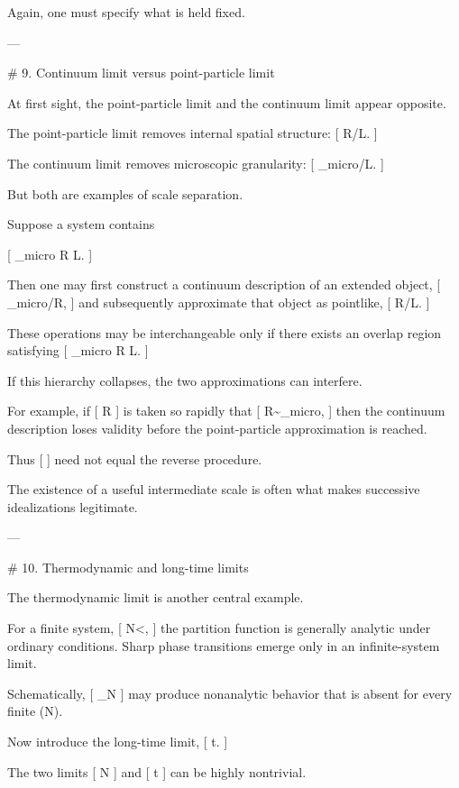 Again, one must specify what is held fixed.

---

# 9. Continuum limit versus point-particle limit

At first sight, the point-particle limit and the continuum limit appear opposite.

The point-particle limit removes internal spatial structure:
[
R/L.
]

The continuum limit removes microscopic granularity:
[
\ell_{\rm micro}/L.
]

But both are examples of scale separation.

Suppose a system contains

[
\ell_{\rm micro}
\ll
R
\ll
L.
]

Then one may first construct a continuum description of an extended object,
[
\ell_{\rm micro}/R,
]
and subsequently approximate that object as pointlike,
[
R/L.
]

These operations may be interchangeable only if there exists an overlap region satisfying
[
\ell_{\rm micro}
\ll
R
\ll
L.
]

If this hierarchy collapses, the two approximations can interfere.

For example, if
[
R
]
is taken so rapidly that
[
R\sim\ell_{\rm micro},
]
then the continuum description loses validity before the point-particle approximation is reached.

Thus
[
\quad{}\quad
{}
]
need not equal the reverse procedure.

The existence of a useful intermediate scale is often what makes successive idealizations legitimate.

---

# 10. Thermodynamic and long-time limits

The thermodynamic limit is another central example.

For a finite system,
[
N<\infty,
]
the partition function is generally analytic under ordinary conditions. Sharp phase transitions emerge only in an infinite-system limit.

Schematically,
[
\lim_{N\rightarrow\infty}
]
may produce nonanalytic behavior that is absent for every finite (N).

Now introduce the long-time limit,
[
t\rightarrow\infty.
]

The two limits
[
N\rightarrow\infty
]
and
[
t\rightarrow\infty
]
can be highly nontrivial.

